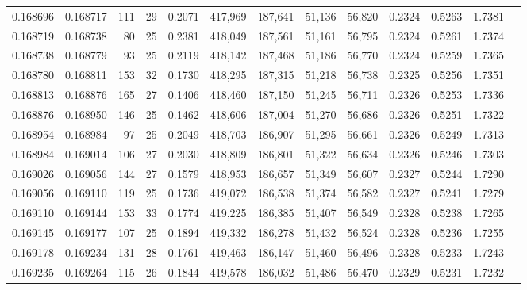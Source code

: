 \begin{tabular}{rrrrrrrrrrrrr}
0.168696 & 0.168717 & 111 &  29 &                                     0.2071 & 417,969 & 187,641 &  51,136 &  56,820 & 0.2324 & 0.5263 & 1.7381 \\
0.168719 & 0.168738 &  80 &  25 &                                     0.2381 & 418,049 & 187,561 &  51,161 &  56,795 & 0.2324 & 0.5261 & 1.7374 \\
0.168738 & 0.168779 &  93 &  25 &                                     0.2119 & 418,142 & 187,468 &  51,186 &  56,770 & 0.2324 & 0.5259 & 1.7365 \\
0.168780 & 0.168811 & 153 &  32 &                                     0.1730 & 418,295 & 187,315 &  51,218 &  56,738 & 0.2325 & 0.5256 & 1.7351 \\
0.168813 & 0.168876 & 165 &  27 &                                     0.1406 & 418,460 & 187,150 &  51,245 &  56,711 & 0.2326 & 0.5253 & 1.7336 \\
0.168876 & 0.168950 & 146 &  25 &                                     0.1462 & 418,606 & 187,004 &  51,270 &  56,686 & 0.2326 & 0.5251 & 1.7322 \\
0.168954 & 0.168984 &  97 &  25 &                                     0.2049 & 418,703 & 186,907 &  51,295 &  56,661 & 0.2326 & 0.5249 & 1.7313 \\
0.168984 & 0.169014 & 106 &  27 &                                     0.2030 & 418,809 & 186,801 &  51,322 &  56,634 & 0.2326 & 0.5246 & 1.7303 \\
0.169026 & 0.169056 & 144 &  27 &                                     0.1579 & 418,953 & 186,657 &  51,349 &  56,607 & 0.2327 & 0.5244 & 1.7290 \\
0.169056 & 0.169110 & 119 &  25 &                                     0.1736 & 419,072 & 186,538 &  51,374 &  56,582 & 0.2327 & 0.5241 & 1.7279 \\
0.169110 & 0.169144 & 153 &  33 &                                     0.1774 & 419,225 & 186,385 &  51,407 &  56,549 & 0.2328 & 0.5238 & 1.7265 \\
0.169145 & 0.169177 & 107 &  25 &                                     0.1894 & 419,332 & 186,278 &  51,432 &  56,524 & 0.2328 & 0.5236 & 1.7255 \\
0.169178 & 0.169234 & 131 &  28 &                                     0.1761 & 419,463 & 186,147 &  51,460 &  56,496 & 0.2328 & 0.5233 & 1.7243 \\
0.169235 & 0.169264 & 115 &  26 &                                     0.1844 & 419,578 & 186,032 &  51,486 &  56,470 & 0.2329 & 0.5231 & 1.7232 \\

\end{tabular}
